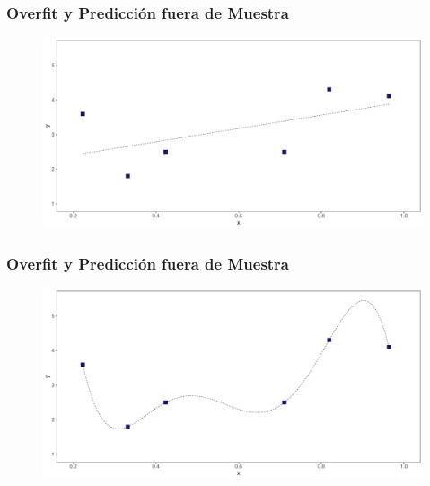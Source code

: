 \documentclass[
  shownotes,
  xcolor={svgnames},
  hyperref={colorlinks,citecolor=DarkBlue,linkcolor=andesred,urlcolor=DarkBlue}
  , aspectratio=169]{beamer}
\begin{document}
\begin{frame}
\frametitle{Overfit y Predicción fuera de Muestra}


        \begin{figure}[H] \centering
            \captionsetup{justification=centering}
              \includegraphics[scale=0.4]{figures/fig_1_poly1.pdf}
 \end{figure}



\end{frame}

\begin{frame}
\frametitle{Overfit y Predicción fuera de Muestra}


        \begin{figure}[H] \centering
            \captionsetup{justification=centering}
              \includegraphics[scale=0.4]{figures/fig_1_poly5.pdf}
 \end{figure}

\end{frame}
\end{document}
